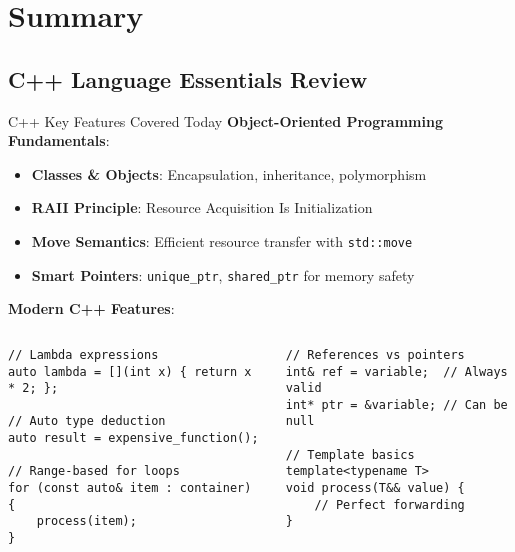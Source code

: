 \section{Summary}

\subsection{C++ Language Essentials Review}
\begin{frame}[fragile]{ C++ Key Features Covered Today}
	\textbf{Object-Oriented Programming Fundamentals}:
	\begin{itemize}
		\item \textbf{Classes \& Objects}: Encapsulation, inheritance, polymorphism
		\item \textbf{RAII Principle}: Resource Acquisition Is Initialization
		\item \textbf{Move Semantics}: Efficient resource transfer with \texttt{std::move}
		\item \textbf{Smart Pointers}: \texttt{unique\_ptr}, \texttt{shared\_ptr} for memory safety
	\end{itemize}

	\vspace{0.5em}
	\textbf{Modern C++ Features}:
	\begin{columns}
		\begin{column}{0.5\textwidth}
			\begin{verbatim}
// Lambda expressions
auto lambda = [](int x) { return x * 2; };

// Auto type deduction
auto result = expensive_function();

// Range-based for loops
for (const auto& item : container) {
    process(item);
}
			\end{verbatim}
		\end{column}
		\begin{column}{0.5\textwidth}
			\begin{verbatim}
// References vs pointers
int& ref = variable;  // Always valid
int* ptr = &variable; // Can be null

// Template basics
template<typename T>
void process(T&& value) {
    // Perfect forwarding
}
			\end{verbatim}
		\end{column}
	\end{columns}
\end{frame}

